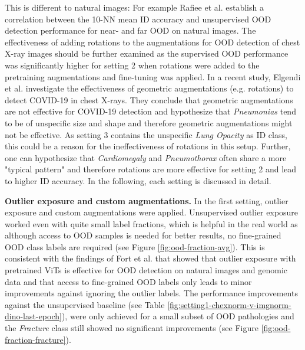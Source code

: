 This is different to natural images: For example Rafiee et al. \citep{Rafiee2022} establish a correlation between the 10-NN mean ID accuracy and unsupervised OOD detection performance for near- and far OOD on natural images.
The effectiveness of adding rotations to the augmentations for OOD detection of chest X-ray images should be further examined as the supervised OOD performance was significantly higher for setting 2 when rotations were added to the pretraining augmentations and fine-tuning was applied.
In a recent study, Elgendi et al. \citep{Elgendi2021} investigate the effectiveness of geometric augmentations (e.g. rotations) to detect COVID-19 in chest X-rays.
They conclude that geometric augmentations are not effective for COVID-19 detection and hypothesize \citep{Elgendi2021} that \textit{Pneumonias} tend to be of unspecific size and shape and therefore geometric augmentations might not be effective.
As setting 3 contains the unspecific \textit{Lung Opacity} as ID class, this could be a reason for the ineffectiveness of rotations in this setup.
Further, one can hypothesize that \textit{Cardiomegaly} and \textit{Pneumothorax} often share a more "typical pattern" and therefore rotations are more effective for setting 2 and lead to higher ID accuracy.
In the following, each setting is discussed in detail.
\par
\textbf{Outlier exposure and custom augmentations.}
In the first setting, outlier exposure and custom augmentations were applied.
Unsupervised outlier exposure worked even with quite small label fractions, which is helpful in the real world as although access to OOD samples is needed for better results, no fine-grained OOD class labels are required (see Figure \ref{fig:ood-fraction-avg}).
This is consistent with the findings of Fort et al. \citep{Fort2021} that showed that outlier exposure with pretrained ViTs is effective for OOD detection on natural images and genomic data and that access to fine-grained OOD labels only leads to minor improvements against ignoring the outlier labels.
The performance improvements against the unsupervised baseline (see Table \ref{fig:setting1-chexnorm-v-imgnorm-dino-last-epoch}), were only achieved for a small subset of OOD pathologies and the \textit{Fracture} class still showed no significant improvements (see Figure \ref{fig:ood-fraction-fracture}).
